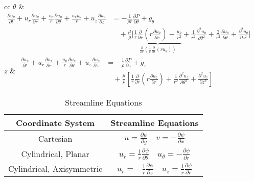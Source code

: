 \begin{table}[h]
\begin{tabular}{cc}
        $\theta$ & \(\displaystyle \begin{aligned} \frac{\partial u_{\theta}}{\partial t} + u_r \frac{\partial u_{\theta}}{\partial r} + \frac{u_{\theta}}{r} \frac{\partial u_{\theta}}{\partial \theta} + \frac{u_r u_{\theta}}{r} + u_z \frac{\partial u_{\theta}}{\partial z} &= -\frac{1}{\rho r} \frac{\partial P}{\partial \theta} + g_{\theta} \\ &\quad + \frac{\mu}{\rho} \biggr[\underbrace{\frac{1}{r} \frac{\partial}{\partial r}\left(r \frac{\partial u_{\theta}}{\partial r}\right) - \frac{u_{\theta}}{r^2}}_{\displaystyle \frac{\partial}{\partial r}\left(\frac{1}{r}\frac{\partial}{\partial r}(r u_{\theta})\right)} + \frac{1}{r^2} \frac{\partial^2 u_{\theta}}{\partial \theta^2} + \frac{2}{r^2} \frac{\partial u_{\theta}}{\partial \theta} + \frac{\partial^2 u_{\theta}}{\partial z^2}\biggr] \end{aligned}\) \\[9ex]
        $z$ & \(\displaystyle \begin{aligned} \frac{\partial u_z}{\partial t} + u_r \frac{\partial u_z}{\partial r} + \frac{u_{\theta}}{r} \frac{\partial u_z}{\partial \theta} + u_z \frac{\partial u_z}{\partial z} &= -\frac{1}{\rho} \frac{\partial P}{\partial z} + g_z \\ &\quad + \frac{\mu}{\rho} \left[\frac{1}{r} \frac{\partial}{\partial r}\left(r \frac{\partial u_z}{\partial r}\right) + \frac{1}{r^2} \frac{\partial^2 u_z}{\partial \theta^2} + \frac{\partial^2 u_z}{\partial z^2}\right] \end{aligned}\) \\[7ex]
        \bottomrule
    \end{tabular}
\end{table}

\begin{table}[H]
    \centering
    \caption{Streamline Equations}
    \begin{tabular}{cc}
        \toprule
        Coordinate System & Streamline Equations \\
        \midrule
        Cartesian & \(\displaystyle u = \frac{\partial \psi}{\partial y} \quad v = -\frac{\partial \psi}{\partial x}\) \\
        Cylindrical, Planar & \(\displaystyle u_r = \frac{1}{r} \frac{\partial \psi}{\partial \theta} \quad u_{\theta} = -\frac{\partial \psi}{\partial r}\) \\[2ex]
        Cylindrical, Axisymmetric & \(\displaystyle u_r = - \frac{1}{r} \frac{\partial \psi}{\partial z} \quad u_z = \frac{1}{r} \frac{\partial \psi}{\partial r}\) \\
        \bottomrule
    \end{tabular}
\end{table}

